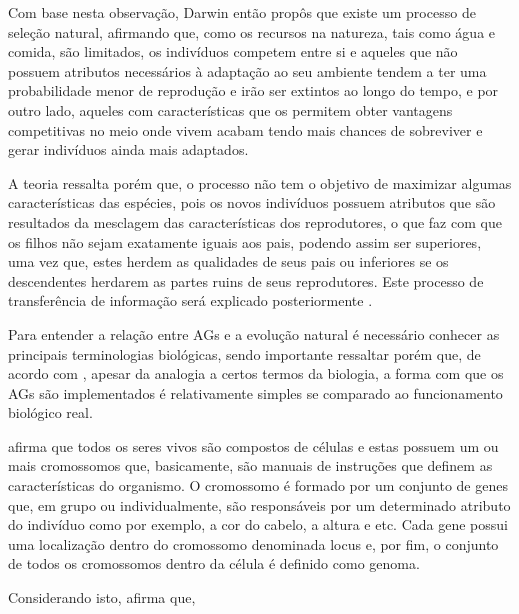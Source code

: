 \par Com base nesta observação, Darwin então propôs que existe um processo de
seleção natural, afirmando que, como os recursos na natureza, tais como água e comida,
são limitados, os indivíduos competem entre si e aqueles que não possuem atributos necessários
à adaptação ao seu ambiente tendem a ter uma probabilidade menor de reprodução e
irão ser extintos ao longo do tempo, e por outro lado, aqueles
com características que os permitem obter vantagens competitivas no meio onde
vivem acabam tendo mais chances de sobreviver e gerar indivíduos ainda mais
adaptados. 

\par A teoria ressalta porém que, o processo não tem o objetivo de maximizar
algumas características das espécies, pois  os novos indivíduos
possuem atributos que são resultados da mesclagem das características dos reprodutores,
o que faz com que os filhos não sejam exatamente iguais aos pais, podendo assim
ser superiores, uma vez que, estes herdem as qualidades de seus pais ou
inferiores se os descendentes herdarem as partes ruins de seus
reprodutores. Este processo de transferência de informação será explicado
posteriormente \cite{livro_ags_ricardo_linden}.

\par Para entender a relação entre AGs e a evolução natural é
necessário conhecer as principais terminologias biológicas, 
sendo importante ressaltar porém que, de acordo com
, apesar da 
analogia a certos termos da biologia, a forma com que os AGs 
são implementados é relativamente simples se comparado ao funcionamento
biológico real.

\par {} afirma que 
todos os seres vivos são compostos de células e estas possuem um ou mais
cromossomos que, basicamente, são manuais de instruções que definem as 
características do organismo. O cromossomo é formado por um conjunto de genes
que, em grupo ou individualmente, são responsáveis por um determinado atributo
do indivíduo como por exemplo, a cor do cabelo, a altura e etc. Cada gene possui
uma localização dentro do cromossomo denominada locus e, por fim, o conjunto de
todos os cromossomos dentro da célula é definido como genoma. 

\par Considerando isto,  afirma que,

